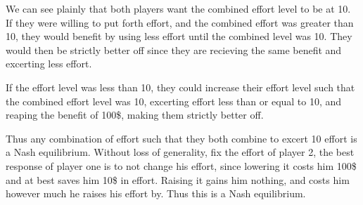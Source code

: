 \documentclass[10pt]{paper}
\begin{document}
We can see plainly that both players want the combined effort level to
be at 10. If they were willing to put forth effort, and the combined
effort was greater than 10, they would benefit by using less effort
until the combined level was 10. They would then be strictly better
off since they are recieving the same benefit and excerting less effort.

If the effort level was less than 10, they could increase their effort
level such that the combined effort level was 10, excerting effort
less than or equal to 10, and reaping the benefit of 100\$, making
them strictly better off.

Thus any combination of effort such that they both combine to excert
10 effort is a Nash equilibrium. Without loss of generality, fix the
effort of player 2, the best response of player one is to not change
his effort, since lowering it costs him 100\$ and at best saves him
10\$ in effort. Raising it gains him nothing, and costs him however
much he raises his effort by. Thus this is a Nash equilibrium. 
\end{document}
